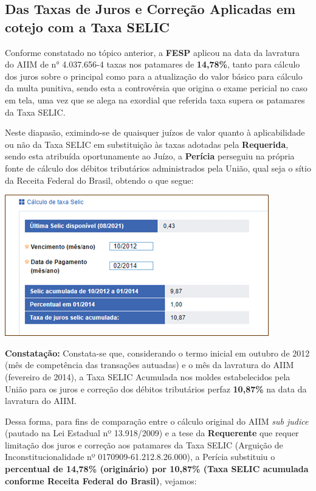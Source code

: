 \hypertarget{3.3}{\subsection{Das Taxas de Juros e Correção Aplicadas em cotejo com a Taxa SELIC}}

Conforme constatado no tópico anterior, a \textbf{FESP} aplicou na data da lavratura do AIIM de n° 4.037.656-4 taxas nos patamares de \textbf{14,78\%}, tanto para cálculo dos juros sobre o principal como para a atualização do valor básico para cálculo da multa punitiva, sendo esta a controvérsia que origina o exame pericial no caso em tela, uma vez que se alega na exordial que referida taxa supera os patamares da Taxa SELIC.

Neste diapasão, eximindo-se de quaisquer juízos de valor quanto à aplicabilidade ou não da Taxa SELIC em substituição às taxas adotadas pela \textbf{Requerida}, sendo esta atribuída oportunamente ao Juízo, a \textbf{Perícia} perseguiu na própria fonte de cálculo dos débitos tributários administrados pela União, qual seja o sítio da Receita Federal do Brasil, obtendo o que segue:

\includegraphics{Imagens/Figura 1 Taxa SELIC acumulada extraída do SICALC (Programa de Atualização Débitos da RFB).png}

\textbf{Constatação:} Constata-se que, considerando o termo inicial em outubro de 2012 (mês de competência das transações autuadas) e o mês da lavratura do AIIM (fevereiro de 2014), a Taxa SELIC Acumulada nos moldes estabelecidos pela União para os juros e correção dos débitos tributários perfaz \textbf{10,87\%} na data da lavratura do AIIM.

Dessa forma, para fins de comparação entre o cálculo original do AIIM \textit{sub judice} (pautado na Lei Estadual nº 13.918/2009) e a tese da \textbf{Requerente} que requer limitação dos juros e correção aos patamares da Taxa SELIC (Arguição de Inconstitucionalidade nº 0170909-61.212.8.26.000), a Perícia substituiu o \textbf{percentual de 14,78\% (originário) por 10,87\% (Taxa SELIC acumulada conforme Receita Federal do Brasil)}, vejamos:

